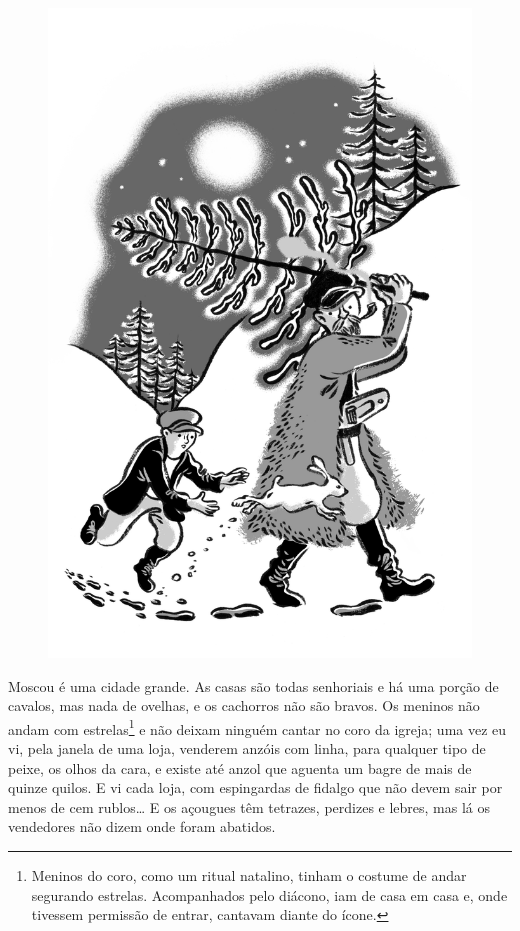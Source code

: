 \begin{figure}%
\vspace*{-1.6cm}
\hspace*{-1.8cm}\includegraphics{./imgs/cena6.jpg}
\end{figure}

Moscou é uma cidade grande. As casas são todas senhoriais e há uma
porção de cavalos, mas nada de ovelhas, e os cachorros não são bravos.
Os meninos não andam com estrelas\footnote{Meninos do coro, como um
  ritual natalino, tinham o costume de andar segurando estrelas.
  Acompanhados pelo diácono, iam de casa em casa e, onde tivessem
  permissão de entrar, cantavam diante do ícone.} e não deixam
ninguém cantar no coro da igreja; uma vez eu vi, pela janela de uma
loja, venderem anzóis com linha, para qualquer tipo de peixe, os olhos
da cara, e existe até anzol que aguenta um bagre de mais de quinze
quilos. E vi cada loja, com espingardas de fidalgo que não devem
sair por menos de cem rublos\ldots{} E os açougues têm tetrazes, perdizes e
lebres, mas lá os vendedores não dizem onde foram abatidos.

